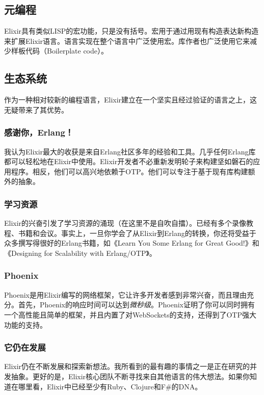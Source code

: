\subsection{元编程}

Elixir具有类似LISP的宏功能，只是没有括号。宏用于通过用现有构造表达新构造来扩展Elixir语言。语言实现在整个语言中广泛使用宏。库作者也广泛使用它来减少样板代码（Boilerplate code）。

\subsection{生态系统}

作为一种相对较新的编程语言，Elixir建立在一个坚实且经过验证的语言之上，这无疑带来了其优势。


\subsubsection{感谢你，Erlang！}

我认为Elixir最大的收获是来自Erlang社区多年的经验和工具。几乎任何Erlang库都可以轻松地在Elixir中使用。Elixir开发者不必重新发明轮子来构建坚如磐石的应用程序。相反，他们可以高兴地依赖于OTP。他们可以专注于基于现有库构建额外的抽象。


\subsubsection{学习资源}

Elixir的兴奋引发了学习资源的涌现（在这里不是自吹自擂）。已经有多个录像教程、书籍和会议。事实上，一旦你学会了从Elixir到Erlang的转换，你还将受益于众多撰写得很好的Erlang书籍，如《Learn
You Some Erlang for Great Good!》和《Designing for Scalability with
Erlang/OTP》。


\subsubsection{Phoenix}

Phoenix是用Elixir编写的网络框架，它让许多开发者感到非常兴奋，而且理由充分。首先，Phoenix的响应时间可以达到\emph{微秒级}。Phoenix证明了你可以同时拥有一个高性能且简单的框架，并且内置了对WebSockets的支持，还得到了OTP强大功能的支持。


\subsubsection{它仍在发展}

Elixir仍在不断发展和探索新想法。我所看到的最有趣的事情之一是正在研究的并发抽象。更好的是，Elixir核心团队不断寻找来自其他语言的伟大想法。如果你知道在哪里看，Elixir中已经至少有Ruby、Clojure和F\#的DNA。

